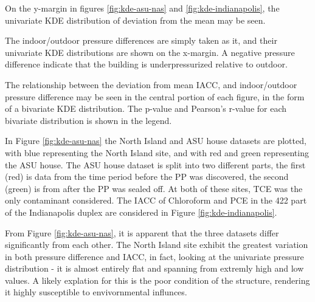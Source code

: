 \documentclass[journal=esthag,manuscript=article]{achemso}
\begin{document}
On the y-margin in figures \ref{fig:kde-asu-nas} and \ref{fig:kde-indianapolis}, the univariate KDE distribution of deviation from the mean may be seen. \par
The indoor/outdoor pressure differences are simply taken as it, and their univariate KDE distributions are shown on the x-margin.
A negative pressure difference indicate that the building is underpressurized relative to outdoor.\par
The relationship between the deviation from mean IACC, and indoor/outdoor pressure difference may be seen in the central portion of each figure, in the form of a bivariate KDE distribution.
The p-value and Pearson's r-value for each bivariate distribution is shown in the legend.\par
In Figure \ref{fig:kde-asu-nas} the North Island and ASU house datasets are plotted, with blue representing the North Island site, and with red and green representing the ASU house.
The ASU house dataset is split into two different parts, the first (red) is data from the time period before the PP was discovered, the second (green) is from after the PP was sealed off.
At both of these sites, TCE was the only contaminant considered.
The IACC of Chloroform and PCE in the 422 part of the Indianapolis duplex are considered in Figure \ref{fig:kde-indianapolis}.\par
From Figure \ref{fig:kde-asu-nas}, it is apparent that the three datasets differ significantly from each other.
The North Island site exhibit the greatest variation in both pressure difference and IACC, in fact, looking at the univariate pressure distribution - it is almost entirely flat and spanning from extremly high and low values.
A likely explation for this is the poor condition of the structure, rendering it highly susceptible to envivornmental influnces.\par
\end{document}
